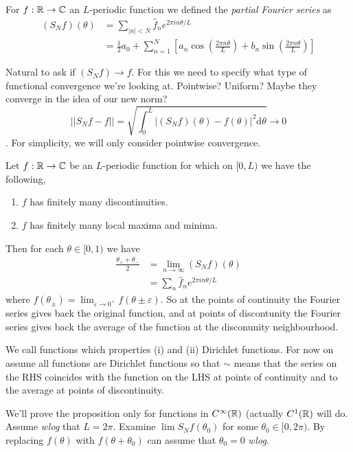 \documentclass{article}
\begin{document}
\begin{definition}
	For $ f:\mathbb{R}\to \mathbb{C} $ an $ L $-periodic function we defined the \textit{partial Fourier series} as
	\begin{align*}
		(S_Nf)(\theta)&=\sum_{|n|<N}\hat f_ne^{2\pi in\theta /L} \\
			      &= \frac 12a_0+\sum_{n=1}^N\left[a_n\cos\left(\frac {2\pi n\theta}L\right)+b_n\sin\left(\frac{2\pi n\theta}L\right)\right]
	\end{align*}
\end{definition}
Natural to ask if $ (S_Nf)\to f $. For this we need to specify what type of functional convergence we're looking at. Pointwise? Uniform? Maybe they converge in the idea of our new norm?
\[
	||S_Nf-f||=\sqrt{\int_0^L|(S_Nf)(\theta)-f(\theta)|^2\mathrm d\theta}\to 0
\].
For simplicity, we will only consider pointwise convergence.
\begin{proposition}
  Let $ f:\mathbb{R}\to\mathbb{C} $ be an $ L $-periodic function for which on $ [0,L) $ we have the following,
  \begin{enumerate}
	  \item $ f $ has finitely many discontinuities.
	  \item $ f $ has finitely many local maxima and minima.
  \end{enumerate}
  Then for each $ \theta\in[0,1) $ we have
  \begin{align*}
	  \frac{\theta_++\theta_-}2 &= \lim_{n\to \infty}(S_Nf)(\theta)\\
				    &= \sum_n\hat f_n e^{2\pi in\theta/L}
  \end{align*}
where $ f(\theta_\pm) = \lim_{\varepsilon\to 0^+}f(\theta \pm \varepsilon) $. So at the points of continuity the Fourier series gives back the original function, and at points of discontunity the Fourier series gives back the average of the function at the disconunity neighbourhood.
\end{proposition}
We call functions which properties (i) and (ii) Dirichlet functions. For now on assume all functions are Dirichlet functions so that $ \sim $ means that the series on the RHS coincides with the function on the LHS at points of continuity and to the average at points of discontinuity.\par
\pf We'll prove the proposition only for functions in $ C^\infty(\mathbb{R}) $ (actually $ C^1(\mathbb{R}) $ will do.\\
Assume \textit{wlog} that $ L=2\pi $. Examine $ \lim S_Nf(\theta_0) $ for some $ \theta_0\in[0,2\pi) $. By replacing $ f(\theta) $ with $ f(\theta+\theta_0) $ can assume that $ \theta_0=0 $ \textit{wlog}.
\end{document}
